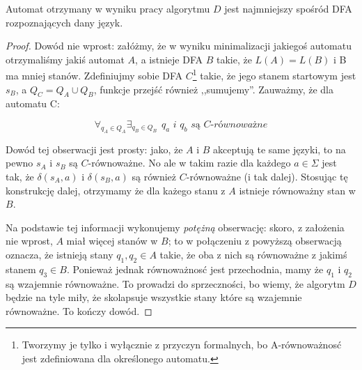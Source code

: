 \begin{theorem}
    Automat otrzymany w wyniku pracy algorytmu \(D\) jest najmniejszy spośród DFA rozpoznających dany język.
\end{theorem}
\begin{proof}
    Dowód nie wprost: załóżmy, że w wyniku minimalizacji jakiegoś automatu otrzymaliśmy jakiś automat \(A\), a istnieje DFA \(B\) takie, że \( L(A) = L(B) \) i B ma mniej stanów. Zdefiniujmy sobie DFA \(C\)\footnote{Tworzymy je tylko i wyłącznie z przyczyn formalnych, bo A-równoważnosć jest zdefiniowana dla określonego automatu.} takie, że jego stanem startowym jest \(s_B\), a \(Q_C = Q_A \cup Q_B\), funkcje przejść również ,,sumujemy''. Zauważmy, że dla automatu C:
    
    \[
        \forall_{q_A \in Q_A} \exists_{q_B \in Q_B}  \hspace{5pt} \textit{\(q_a\) i \(q_b\) są \(C\)-równoważne}
    \]
    
    Dowód tej obserwacji jest prosty: jako, że \(A\) i \(B\) akceptują te same języki, to na pewno \(s_A\) i \(s_B\) są \(C\)-równoważne. No ale w takim razie dla każdego \(a \in \Sigma\) jest tak, że \(\delta(s_A, a)\) i \(\delta(s_B, a)\) są również \(C\)-równoważne (i tak dalej). Stosując tę konstrukcję dalej, otrzymamy że dla każego stanu z \(A\) istnieje równoważny stan w \(B\). 
    
    Na podstawie tej informacji wykonujemy \textit{potężną} obserwację: skoro, z założenia nie wprost, \(A\) miał więcej stanów w \(B\); to w połączeniu z powyższą obserwacją oznacza, że istnieją stany \(q_1, q_2 \in A\) takie, że oba z nich są równoważne z jakimś stanem \(q_3 \in B\). Ponieważ jednak równoważnosć jest przechodnia, mamy że \(q_1\) i \(q_2\) są wzajemnie równoważne. To prowadzi do sprzeczności, bo wiemy, że algorytm \(D\) będzie na tyle miły, że skolapsuje wszystkie stany które są wzajemnie równoważne. To kończy dowód. 
    
\end{proof}